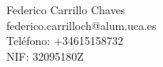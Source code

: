 Federico Carrillo Chaves \\ %
federico.carrilloch@alum.uca.es \\ %
Teléfono: +34615158732 \\ %
NIF: 32095180Z \\ %
